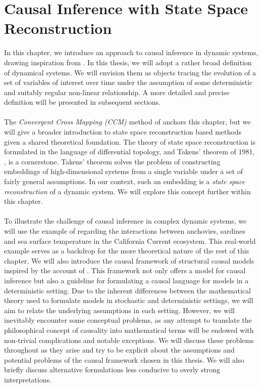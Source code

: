 \documentclass[11pt, a4paper]{memoir}
\theoremstyle{break}
\theoremstyle{break}
\theoremstyle{nonumberplain}
\begin{document}
\chapter{Causal Inference with State Space Reconstruction}\label{chapTaken}
In this chapter, we introduce an approach to causal inference in dynamic systems, drawing inspiration from \cite{Sugihara}. In this thesis, we will adopt a rather broad definition of dynamical systems. We will envision them as objects tracing the evolution of a set of variables of interest over time under the assumption of some deterministic and suitably regular non-linear relationship. A more detailed and precise definition will be presented in subsequent sections.\\\\ The \textit{Convergent Cross Mapping (CCM)} method of \cite{Sugihara} anchors this chapter, but we will give a broader introduction to state space reconstruction based methods given a shared theoretical foundation. The theory of state space reconstruction is formulated in the language of differential topology, and Takens' theorem of 1981, \cite{Takens}, is a cornerstone. Takens' theorem solves the problem of constructing embeddings of high-dimensional systems from a single variable under a set of fairly general assumptions. In our context, such an embedding is a \textit{state space reconstruction} of a dynamic system. We will explore this concept further within this chapter.\\\\
To illustrate the challenge of causal inference in complex dynamic systems, we will use the example of \cite{Sugihara} regarding the interactions between anchovies, sardines and sea surface temperature in the California Current ecosystem. This real-world example serves as a backdrop for the more theoretical nature of the rest of this chapter. We will also introduce the causal framework of structural causal models inspired by the account of \cite{Peters}. This framework not only offers a model for causal inference but also a guideline for formulating a causal language for models in a deterministic setting. Due to the inherent differences between the mathematical theory used to formulate models in stochastic and deterministic settings, we will aim to relate the underlying assumptions in each setting. However, we will inevitably encounter some conceptual problems, as any attempt to translate the philosophical concept of causality into mathematical terms will be endowed with non-trivial complications and notable exceptions. We will discuss these problems throughout as they arise and try to be explicit about the assumptions and potential problems of the causal framework chosen in this thesis. We will also briefly discuss alternative formulations less conducive to overly strong interpretations.\\\\
\end{document}
